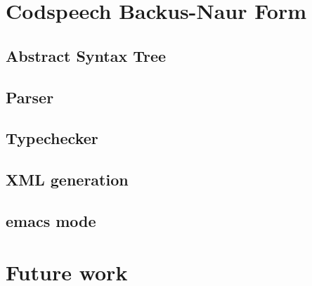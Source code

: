\section{Codspeech Backus-Naur Form}


\subsection{Abstract Syntax Tree}
\subsection{Parser}
\subsection{Typechecker}
\subsection{XML generation}
\subsection{emacs mode}


\section{Future work}
